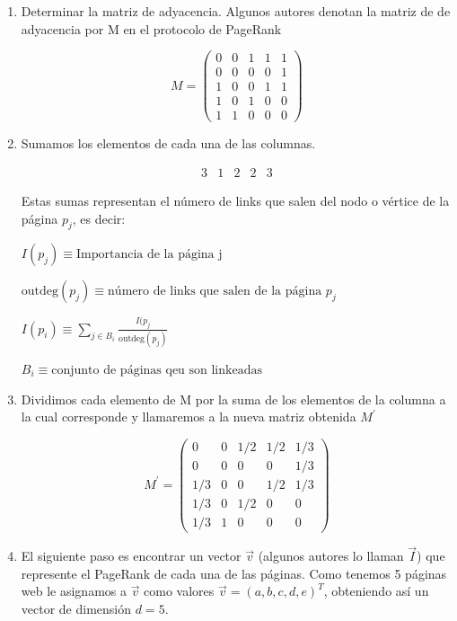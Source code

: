 \begin{enumerate}
\item Determinar la matriz de adyacencia. Algunos autores denotan la matriz de de adyacencia por M en el protocolo de PageRank

\[
M = \begin{pmatrix}
0 & 0 & 1 & 1 & 1 \\
0 & 0 & 0 & 0 & 1 \\
1 & 0 & 0 & 1 & 1 \\
1 & 0 & 1 & 0 & 0 \\
1 & 1 & 0 & 0 & 0
\end{pmatrix}
\]

\item Sumamos los elementos de cada una de las columnas.

\[
\begin{matrix}
3 & 1 & 2 & 2 & 3
\end{matrix}
\]

Estas sumas representan el número de links que salen del nodo o vértice de la página $p_j$, es decir: 

\color{red}
$I(p_j) \equiv \text{Importancia de la página j}$

$\mathrm{outdeg}(p_j) \equiv \text{número de links que salen de la página } p_j$

$I(p_i) \equiv \sum\limits_{j \in B_i} \frac{I(p_j}{\mathrm{outdeg}(p_j)}$

$B_i \equiv \text{conjunto de páginas qeu son linkeadas}$
\color{black}

\item Dividimos cada elemento de M por la suma de los elementos de la columna a la cual corresponde y llamaremos a la nueva matriz obtenida $M^\prime$

\[
M^\prime = \begin{pmatrix}
0 & 0 & 1/2 & 1/2 & 1/3 \\
0 & 0 & 0 & 0 & 1/3 \\
1/3 & 0 & 0 & 1/2 & 1/3 \\
1/3 & 0 & 1/2 & 0 & 0 \\
1/3 & 1 & 0 & 0 & 0
\end{pmatrix}
\]

\item El siguiente paso es encontrar un vector $\vec{v}$ (algunos autores lo llaman $\vec{I}$) que represente el PageRank de cada una de las páginas. Como tenemos 5 páginas web le asignamos a $\vec{v}$ como valores $\vec{v} = (a,b,c,d,e)^T$, obteniendo así un vector de dimensión $d=5$.


\end{enumerate}
